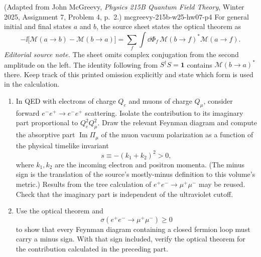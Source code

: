 \begin{enumerate}
  {(Adapted from John McGreevy, \emph{Physics 215B Quantum Field Theory}, Winter 2025, Assignment 7, Problem 4, p.~2.)}
  {mcgreevy-215b-w25-hw07-p4}
For general initial and final states \(a\) and \(b\), the source sheet
states the optical theorem as
\[
 -\ii\bigl[\mathcal M(a\to b)-\mathcal M(b\to a)\bigr]
 =\sum_f\int \dd\Phi_f\,
   \mathcal M(b\to f)^*\mathcal M(a\to f).
\]
\emph{Editorial source note.}  The sheet omits complex conjugation from the
second amplitude on the left.  The identity following from
\(S^\dagger S=\mathbf 1\) contains \(\mathcal M(b\to a)^*\) there.  Keep
track of this printed omission explicitly and state which form is used in
the calculation.
\begin{enumerate}
\item
In QED with electrons of charge \(Q_e\) and muons of charge \(Q_\mu\),
consider forward \(e^-e^+\to e^-e^+\) scattering.  Isolate the contribution
to its imaginary part proportional to \(Q_e^2Q_\mu^2\).  Draw the relevant
Feynman diagram and compute the absorptive part
\(\operatorname{Im}\Pi_\mu\) of the muon vacuum polarization as a function
of the physical timelike invariant
\[
 s\equiv-(k_1+k_2)^2>0,
\]
where \(k_1,k_2\) are the incoming electron and positron momenta.  (The
minus sign is the translation of the source's mostly-minus definition to
this volume's metric.)  Results from the tree calculation of
\(e^+e^-\to\mu^+\mu^-\) may be reused.  Check that the imaginary part is
independent of the ultraviolet cutoff.
\item
Use the optical theorem and
\[
 \sigma(e^+e^-\to\mu^+\mu^-)\geq0
\]
to show that every Feynman diagram containing a closed fermion loop must
carry a minus sign.  With that sign included, verify the optical theorem for
the contribution calculated in the preceding part.
\end{enumerate}


\end{enumerate}
